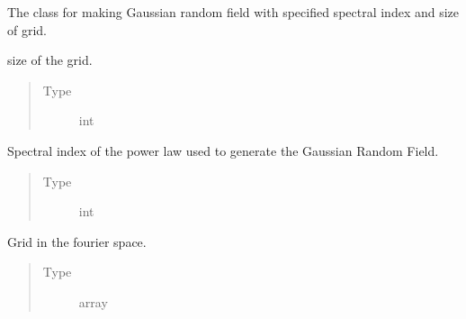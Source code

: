 \documentclass[letterpaper,10pt,english]{sphinxmanual}
\begin{document}
\begin{fulllineitems}
\label{\detokenize{gaussClass:gaussClass.GaussianRandomField}}
\sphinxAtStartPar
The class for making Gaussian random field with specified spectral index and size of grid.

\begin{fulllineitems}
\label{\detokenize{gaussClass:gaussClass.GaussianRandomField.Nzise}}
\sphinxAtStartPar
size of the grid.
\begin{quote}\begin{description}
\item[{Type}] \leavevmode
\sphinxAtStartPar
int

\end{description}\end{quote}

\end{fulllineitems}


\begin{fulllineitems}
\label{\detokenize{gaussClass:gaussClass.GaussianRandomField.n}}
\sphinxAtStartPar
Spectral index of the power law used to generate the Gaussian Random Field.
\begin{quote}\begin{description}
\item[{Type}] \leavevmode
\sphinxAtStartPar
int

\end{description}\end{quote}

\end{fulllineitems}


\begin{fulllineitems}
\label{\detokenize{gaussClass:gaussClass.GaussianRandomField.k_ind}}
\sphinxAtStartPar
Grid in the fourier space.
\begin{quote}\begin{description}
\item[{Type}] \leavevmode
\sphinxAtStartPar
array


\end{description}
\end{quote}
\end{fulllineitems}
\end{fulllineitems}
\end{document}
